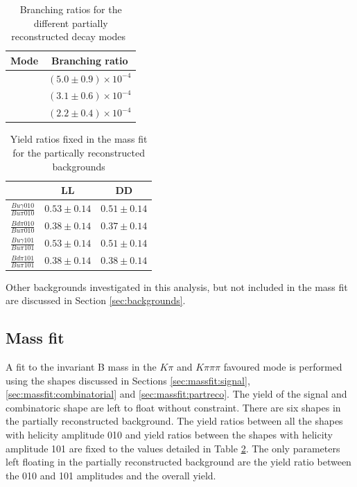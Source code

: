 \begin{table}[h]
\centering
\begin{tabular}{c|c}
Mode & Branching ratio \\
\hline
\decay{\Bm}{(\decay{\Dstarz}{\Dz[\piz]})\Kstarm} & $(5.0 \pm 0.9) \times 10^{-4}$ \\
\decay{\Bm}{(\decay{\Dstarz}{\Dz[\gamma]})\Kstarm} & $(3.1 \pm 0.6) \times 10^{-4}$ \\
\decay{\Bd}{(\decay{\Dstarp}{\Dz[\pip]})\Kstarm} & $(2.2 \pm 0.4) \times 10^{-4}$ \\
\end{tabular}
\caption{Branching ratios for the different partially reconstructed decay modes~\cite{PDG2014}}
\label{partrecoBRs}
\end{table}

\begin{table}
\centering
\begin{tabular}{ccc}
\hline
& LL & DD \\
\hline
$\frac{Bu \gamma 010}{Bu \pi 010}$ & $0.53 \pm 0.14$ & $0.51 \pm 0.14$ \\[3mm]
$\frac{Bd \pi 010}{Bu \pi 010}$ & $0.38 \pm 0.14$ & $0.37 \pm 0.14$ \\[3mm]
$\frac{Bu \gamma 101}{Bu \pi 101}$ & $0.53 \pm 0.14$ & $0.51 \pm 0.14$ \\[3mm]
$\frac{Bd \pi 101}{Bu \pi 101}$ & $0.38 \pm 0.14$ & $0.38 \pm 0.14$ \\[3mm]
\hline
\end{tabular}
\caption{Yield ratios fixed in the mass fit for the partically reconstructed backgrounds}
\label{fixedyieldratios}
\end{table}

Other backgrounds investigated in this analysis, but not included in the mass fit are discussed in Section \ref{sec:backgrounds}.


\subsection{Mass fit}
\label{sec:massfit:fit}

A fit to the invariant B mass in the $K\pi$ and $K\pi\pi\pi$ favoured mode is performed using the shapes discussed in Sections \ref{sec:massfit:signal}, \ref{sec:massfit:combinatorial} and \ref{sec:massfit:partreco}. The yield of the signal and combinatoric shape are left to float without constraint. There are six shapes in the partially reconstructed background. The yield ratios between all the shapes with helicity amplitude 010 and yield ratios between the shapes with helicity amplitude 101 are fixed to the values detailed in Table \ref{fixedyieldratios}. The only parameters left floating in the partially reconstructed background are the yield ratio between the 010 and 101 amplitudes and the overall yield. 

